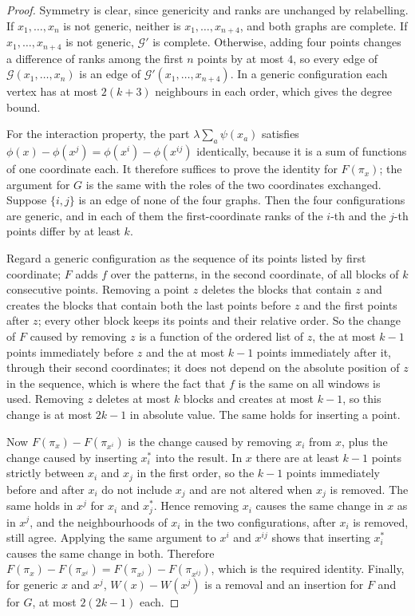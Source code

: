 \documentclass[11pt]{amsart}
\theoremstyle{remark}
\begin{document}
\begin{proof}
Symmetry is clear, since genericity and ranks are unchanged by relabelling. If $x_1,\dots,x_n$ is not generic, neither
is $x_1,\dots,x_{n+4}$, and both graphs are complete. If $x_1,\dots,x_{n+4}$ is not generic, $\mathcal G'$ is complete.
Otherwise, adding four points changes a difference of ranks among the first $n$ points by at most $4$, so every edge of
$\mathcal G(x_1,\dots,x_n)$ is an edge of $\mathcal G'(x_1,\dots,x_{n+4})$. In a generic configuration each vertex has
at most $2(k+3)$ neighbours in each order, which gives the degree bound.

For the interaction property, the part $\lambda\sum_a\psi(x_a)$ satisfies $\phi(x)-\phi(x^j)=\phi(x^i)-\phi(x^{ij})$
identically, because it is a sum of functions of one coordinate each. It therefore suffices to prove the identity for
$F(\pi_x)$; the argument for $G$ is the same with the roles of the two coordinates exchanged. Suppose $\{i,j\}$ is an
edge of none of the four graphs. Then the four configurations are generic, and in each of them the first-coordinate
ranks of the $i$-th and the $j$-th points differ by at least $k$.

Regard a generic configuration as the sequence of its points listed by first coordinate; $F$ adds $f$ over the
patterns, in the second coordinate, of all blocks of $k$ consecutive points. Removing a point $z$ deletes the blocks
that contain $z$ and creates the blocks that contain both the last points before $z$ and the first points after $z$;
every other block keeps its points and their relative order. So the change of $F$ caused by removing $z$ is a function
of the ordered list of $z$, the at most $k-1$ points immediately before $z$ and the at most $k-1$ points immediately
after it, through their second coordinates; it does not depend on the absolute position of $z$ in the sequence, which
is where the fact that $f$ is the same on all windows is used. Removing $z$ deletes at most $k$ blocks and creates
at most $k-1$, so this change is at most $2k-1$ in absolute value. The same holds for inserting a point.

Now $F(\pi_x)-F(\pi_{x^i})$ is the change caused by removing $x_i$ from $x$, plus the change caused by inserting
$x_i^*$ into the result. In $x$ there are at least $k-1$ points strictly between $x_i$ and $x_j$ in the first order, so
the $k-1$ points immediately before and after $x_i$ do not include $x_j$ and are not altered when $x_j$ is removed.
The same holds in $x^j$ for $x_i$ and $x_j^*$. Hence removing $x_i$ causes the same change in $x$ as in $x^j$, and the
neighbourhoods of $x_i$ in the two configurations, after $x_i$ is removed, still agree. Applying the same argument to
$x^i$ and $x^{ij}$ shows that inserting $x_i^*$ causes the same change in both. Therefore
$F(\pi_x)-F(\pi_{x^i})=F(\pi_{x^j})-F(\pi_{x^{ij}})$, which is the required identity. Finally, for generic $x$ and
$x^j$, $W(x)-W(x^j)$ is a removal and an insertion for $F$ and for $G$, at most $2(2k-1)$ each.
\end{proof}
\end{document}

